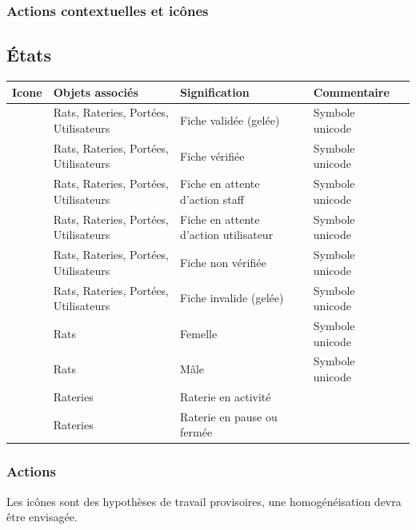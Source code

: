 \documentclass[a4paper,10pt]{article}
\begin{document}
\subsubsection{Actions contextuelles et icônes}
\label{ssec:icons}

\subsection{\'Etats}
\renewcommand{\arraystretch}{1.5}
\begin{longtable}{|c|l|l|l|l|}\hline
\textbf{Icone} & \textbf{Objets associés} & \textbf{Signification} & \textbf{Commentaire}\\\hline
\endhead
 & Rats, Rateries, Portées, Utilisateurs & Fiche validée (gelée) & Symbole unicode \\\hline
 & Rats, Rateries, Portées, Utilisateurs & Fiche vérifiée & Symbole unicode \\\hline
 & Rats, Rateries, Portées, Utilisateurs & Fiche en attente d'action staff & Symbole unicode \\\hline
 & Rats, Rateries, Portées, Utilisateurs & Fiche en attente d'action utilisateur & Symbole unicode \\\hline
 & Rats, Rateries, Portées, Utilisateurs & Fiche non vérifiée & Symbole unicode \\\hline
 & Rats, Rateries, Portées, Utilisateurs & Fiche invalide (gelée) & Symbole unicode \\\hline

 & Rats & Femelle & Symbole unicode \\\hline
 & Rats & Mâle & Symbole unicode \\\hline

 & Rateries & Raterie en activité & \\\hline
 & Rateries & Raterie en pause ou fermée & \\\hline
 
\end{longtable}

\subsubsection{Actions}
Les icônes sont des hypothèses de travail provisoires, une homogénéisation devra être envisagée.
\end{document}
